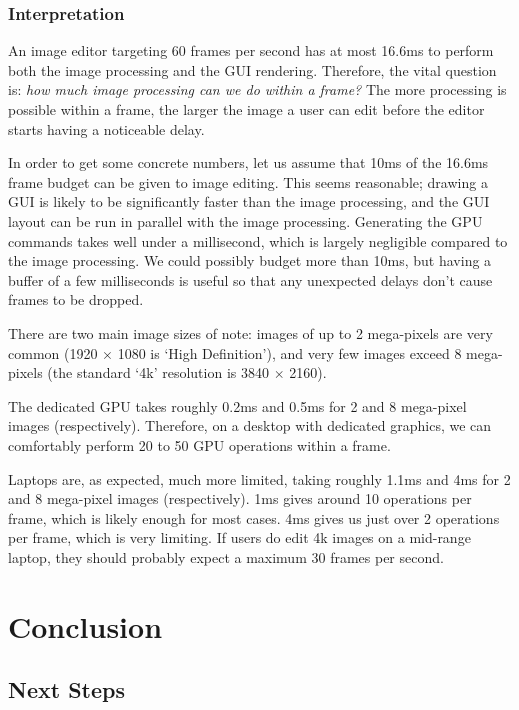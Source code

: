 \documentclass[12pt]{article}
\begin{document}
\subsubsection{Interpretation}

An image editor targeting 60 frames per second has at most 16.6ms to perform both the image
processing and the GUI rendering.  Therefore, the vital question is: \emph{how much image processing
can we do within a frame?}  The more processing is possible within a frame, the larger the image a
user can edit before the editor starts having a noticeable delay.

In order to get some concrete numbers, let us assume that 10ms of the 16.6ms frame budget can be
given to image editing.  This seems reasonable; drawing a GUI is likely to be significantly faster
than the image processing, and the GUI layout can be run in parallel with the image processing.
Generating the GPU commands takes well under a millisecond, which is largely negligible compared to
the image processing.  We could possibly budget more than 10ms, but having a buffer of a few
milliseconds is useful so that any unexpected delays don't cause frames to be dropped.

There are two main image sizes of note: images of up to 2 mega-pixels are very common (1920
$\times$ 1080 is `High Definition'), and very few images exceed 8 mega-pixels (the standard `4k'
resolution is 3840 $\times$ 2160).

The dedicated GPU takes roughly 0.2ms and 0.5ms for 2 and 8 mega-pixel images (respectively).
Therefore, on a desktop with dedicated graphics, we can comfortably perform 20 to 50 GPU operations
within a frame.

Laptops are, as expected, much more limited, taking roughly 1.1ms and 4ms for 2 and 8 mega-pixel
images (respectively).  1ms gives around 10 operations per frame, which is likely enough for most
cases.  4ms gives us just over 2 operations per frame, which is very limiting.  If users do edit 4k
images on a mid-range laptop, they should probably expect a maximum 30 frames per second.



\pagebreak

\section{Conclusion}\label{sec:conclusion}

\subsection{Next Steps}\label{sec:next-steps}
\end{document}
